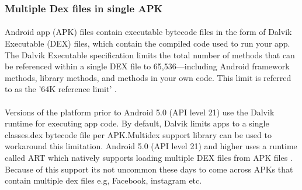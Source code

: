 \documentclass[../main.tex]{subfile}
\begin{document}
			\subsubsection{Multiple Dex files in single APK}
				\paragraph{}  Android app (APK) files contain executable bytecode files in the form of Dalvik Executable (DEX) files, which contain the compiled code used to run your app. The Dalvik Executable specification limits the total number of methods that can be referenced within a single DEX file to 65,536—including Android framework methods, library methods, and methods in your own code. This limit is referred to as the '64K reference limit' .
				
				\paragraph{} Versions of the platform prior to Android 5.0 (API level 21) use the Dalvik runtime for executing app code. By default, Dalvik limits apps to a single classes.dex bytecode file per APK.Multidex support library can be used to workaround this limitation. Android 5.0 (API level 21) and higher uses a runtime called ART which natively supports loading multiple DEX files from APK files . Because of this support its not uncommon these days to come across APKs that contain multiple dex files e.g, Facebook, instagram etc.
			
		
		
\end{document}
